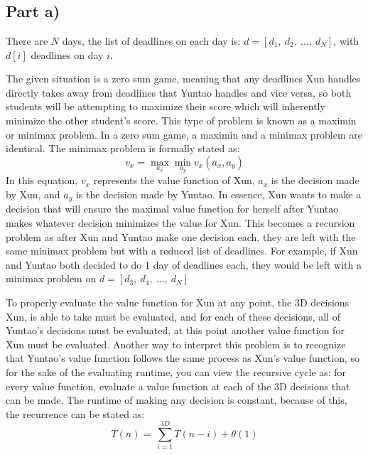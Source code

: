 \section{}

\subsection*{Part a)}

There are $N$ days, the list of deadlines on each day is: $d=[d_1,\ d_2,\ \ldots,\ d_N]$, with $d[i]$ deadlines on day $i$.

The given situation is a zero sum game, meaning that any deadlines Xun handles directly takes away from deadlines that Yuntao handles and vice versa, so both students will be attempting to maximize their score which will inherently minimize the other student's score. This type of problem is known as a maximin or minimax problem. In a zero sum game, a maximin and a minimax problem are identical. The minimax problem is formally stated as:
\[v_x=\max_{a_x}{\min_{a_y}{v_x(a_x,a_y)}}\]
In this equation, $v_x$ represents the value function of Xun, $a_x$ is the decision made by Xun, and $a_y$ is the decision made by Yuntao. In essence, Xun wants to make a decision that will ensure the maximal value function for herself after Yuntao makes whatever decision minimizes the value for Xun. This becomes a recursion problem as after Xun and Yuntao make one decision each, they are left with the same minimax problem but with a reduced list of deadlines. For example, if Xun and Yuntao both decided to do 1 day of deadlines each, they would be left with a minimax problem on $d=[d_3,\ d_4,\ \ldots,\ d_N]$

To properly evaluate the value function for Xun at any point, the 3D decisions Xun, is able to take must be evaluated, and for each of these decisions, all of Yuntao's decisions must be evaluated, at this point another value function for Xun must be evaluated. Another way to interpret this problem is to recognize that Yuntao's value function follows the same process as Xun's value function, so for the sake of the evaluating runtime, you can view the recursive cycle as: for every value function, evaluate a value function at each of the 3D decisions that can be made. The runtime of making any decision is constant, because of this, the recurrence can be stated as:
\[T\left(n\right)=\ \sum_{i=1}^{3D}{T(n-i)}+\theta(1)\]